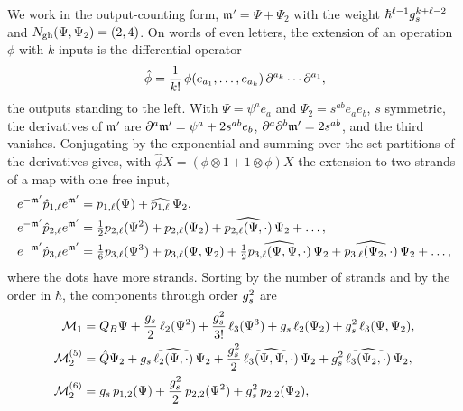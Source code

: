 \noindent{}
We work in the output-counting form, $\mathfrak{m}' = \Psi + \Psi_2$ with the weight $\hbar^{\ell - 1} g_s^{k + \ell - 2}$ and $N_{\text{gh}}(\Psi, \Psi_2) = (2, 4)$.
On words of even letters, the extension of an operation $\phi$ with $k$ inputs is the differential operator
\begin{equation}
  \hat{\phi}
    = \frac{1}{k!} \, \phi(e_{a_1}, \ldots, e_{a_k}) \, \partial^{a_k} \cdots \partial^{a_1},
\end{equation}
the outputs standing to the left.
With $\Psi = \psi^a e_a$ and $\Psi_2 = s^{a b} e_a e_b$, $s$ symmetric, the derivatives of $\mathfrak{m}'$ are $\partial^a \mathfrak{m}' = \psi^a + 2 s^{a b} e_b$, $\partial^a \partial^b \mathfrak{m}' = 2 s^{a b}$, and the third vanishes.
Conjugating by the exponential and summing over the set partitions of the derivatives gives, with $\hat{\phi} X = (\phi \otimes 1 + 1 \otimes \phi) X$ the extension to two strands of a map with one free input,
\begin{equation}
  \begin{aligned}
    e^{- \mathfrak{m}'} \hat{p}_{1, \ell} e^{\mathfrak{m}'}
      &
      = p_{1,\ell}(\Psi) + \widehat{p_{1,\ell}} \, \Psi_2,
    \\
    e^{- \mathfrak{m}'} \hat{p}_{2, \ell} e^{\mathfrak{m}'}
      &
      = \tfrac{1}{2} p_{2,\ell}(\Psi^2) + p_{2,\ell}(\Psi_2) + \widehat{p_{2,\ell}(\Psi, \cdot)} \, \Psi_2 + \ldots,
    \\
    e^{- \mathfrak{m}'} \hat{p}_{3, \ell} e^{\mathfrak{m}'}
      &
      = \tfrac{1}{6} p_{3,\ell}(\Psi^3) + p_{3,\ell}(\Psi, \Psi_2) + \tfrac{1}{2} \widehat{p_{3,\ell}(\Psi, \Psi, \cdot)} \, \Psi_2 + \widehat{p_{3,\ell}(\Psi_2, \cdot)} \, \Psi_2 + \ldots,
  \end{aligned}
\end{equation}
where the dots have more strands.
Sorting by the number of strands and by the order in $\hbar$, the components through order $g_s^2$ are
\begin{subequations}
  \label{ch11:eq:mc-components}
  \begin{align}
    \label{ch11:eq:M1}
    \mathcal{M}_1
      &
      = Q_B \Psi + \frac{g_s}{2} \, \ell_2(\Psi^2) + \frac{g_s^2}{3!} \, \ell_3(\Psi^3) + g_s \, \ell_2(\Psi_2) + g_s^2 \, \ell_3(\Psi, \Psi_2),
    \\
    \label{ch11:eq:M2-5}
    \mathcal{M}_2^{(5)}
      &
      = \hat{Q} \Psi_2 + g_s \, \widehat{\ell_2(\Psi, \cdot)} \, \Psi_2 + \frac{g_s^2}{2} \, \widehat{\ell_3(\Psi, \Psi, \cdot)} \, \Psi_2 + g_s^2 \, \widehat{\ell_3(\Psi_2, \cdot)} \, \Psi_2,
    \\
    \label{ch11:eq:M2-6}
    \mathcal{M}_2^{(6)}
      &
      = g_s \, p_{1,2}(\Psi) + \frac{g_s^2}{2} \, p_{2,2}(\Psi^2) + g_s^2 \, p_{2,2}(\Psi_2),
  \end{align}
\end{subequations}
